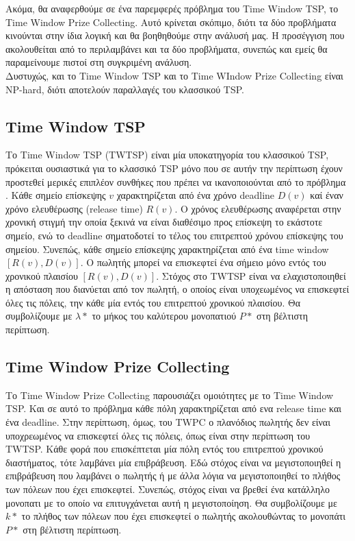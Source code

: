 \documentclass[oneside,12pt]{book}
\theoremstyle{definition}
\begin{document}
Ακόμα, θα αναφερθούμε σε ένα παρεμφερές πρόβλημα του Time Window TSP, το Time Window Prize Collecting. Αυτό κρίνεται σκόπιμο, διότι τα δύο προβλήματα κινούνται στην ίδια λογική και θα βοηθηθούμε στην ανάλυσή μας. Η προσέγγιση που ακολουθείται από το \cite{12} περιλαμβάνει και τα δύο προβλήματα, συνεπώς και εμείς θα παραμείνουμε πιστοί στη συγκριμένη ανάλυση. \\

Δυστυχώς, και το Time Window TSP και το Time WIndow Prize Collecting είναι NP-hard, διότι αποτελούν παραλλαγές του κλασσικού TSP. \\

\subsection{Time Window TSP}

Το Time Window TSP (TWTSP) είναι μία υποκατηγορία του κλασσικού TSP, πρόκειται ουσιαστικά για το κλασσικό TSP μόνο που σε αυτήν την περίπτωση έχουν προστεθεί μερικές επιπλέον συνθήκες που πρέπει να ικανοποιούνται από το πρόβλημα . Κάθε σημείο επίσκεψης \(v\) χαρακτηρίζεται από ένα χρόνο deadline \(D(v)\) καί έναν χρόνο ελευθέρωσης (release time) \(R(v)\). Ο χρόνος ελευθέρωσης αναφέρεται στην χρονική στιγμή την οποία ξεκινά να είναι διαθέσιμο προς επίσκεψη το εκάστοτε σημείο, ενώ το deadline σηματοδοτεί το τέλος του επιτρεπτού χρόνου επίσκεψης του σημείου. Συνεπώς, κάθε σημείο επίσκεψης χαρακτηρίζεται από ένα time window \([R(v), D(v)]\). Ο πωλητής μπορεί να επισκεφτεί ένα σήμειο μόνο εντός του χρονικού πλαισίου \([R(v), D(v)]\). Στόχος στο TWTSP είναι να ελαχιστοποιηθεί η απόσταση που διανύεται από τον πωλητή, ο οποίος είναι υποχεωμένος να επισκεφτεί όλες τις πόλεις, την κάθε μία εντός του επιτρεπτού χρονικού πλαισίου. Θα συμβολίζουμε με \(λ*\) το μήκος του καλύτερου μονοπατιού \(P*\) στη βέλτιστη περίπτωση.  \\

\subsection{Time Window Prize Collecting}

Το Time Window Prize Collecting παρουσιάζει ομοιότητες με το Time Window TSP. Και σε αυτό το πρόβλημα κάθε πόλη χαρακτηρίζεται από ενα release time και ένα deadline. Στην περίπτωση, όμως, του TWPC ο πλανόδιος πωλητής δεν είναι υποχρεωμένος να επισκεφτεί όλες τις πόλεις, όπως είναι στην περίπτωση του TWTSP. Κάθε φορά που επισκέπτεται μία πόλη εντός του επιτρεπτού χρονικού διαστήματος, τότε λαμβάνει μία επιβράβευση. Εδώ στόχος είναι να μεγιστοποιηθεί η επιβράβευση που λαμβάνει ο πωλητής ή με άλλα λόγια να μεγιστοποιηθεί το πλήθος των πόλεων που έχει επισκεφτεί. Συνεπώς, στόχος είναι να βρεθεί ένα κατάλληλο μονοπατι με το οποίο να επιτυγχάνεται αυτή η μεγιστοποίηση. Θα συμβολίζουμε με \(k*\) το πλήθος των πόλεων που έχει επισκεφτεί ο πωλητής ακολουθώντας το μονοπάτι \(P*\) στη βέλτιστη περίπτωση. \\
\end{document}
